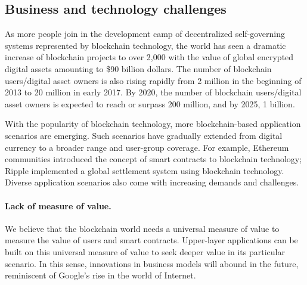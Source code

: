 \subsection{Business and technology challenges}
As more people join in the development camp of decentralized self-governing systems represented by blockchain technology, the world has seen a dramatic increase of blockchain projects to over 2,000 with the value of global encrypted digital assets amounting to \$90 billion dollars. The number of blockchain users/digital asset owners is also rising rapidly from 2 million in the beginning of 2013 to 20 million in early 2017. By 2020, the number of blockchain users/digital asset owners is expected to reach or surpass 200 million, and by 2025, 1 billion.

With the popularity of blockchain technology, more blockchain-based application scenarios are emerging. Such scenarios have gradually extended from digital currency to a broader range and user-group coverage. For example, Ethereum communities introduced the concept of smart contracts to blockchain technology; Ripple implemented a global settlement system using blockchain technology. Diverse application scenarios also come with increasing demands and challenges.

\paragraph{Lack of measure of value.} We believe that the blockchain world needs a universal measure of value to measure the value of users and smart contracts. Upper-layer applications can be built on this universal measure of value to seek deeper value in its particular scenario. In this sense, innovations in business models will abound in the future, reminiscent of Google’s rise in the world of Internet.

